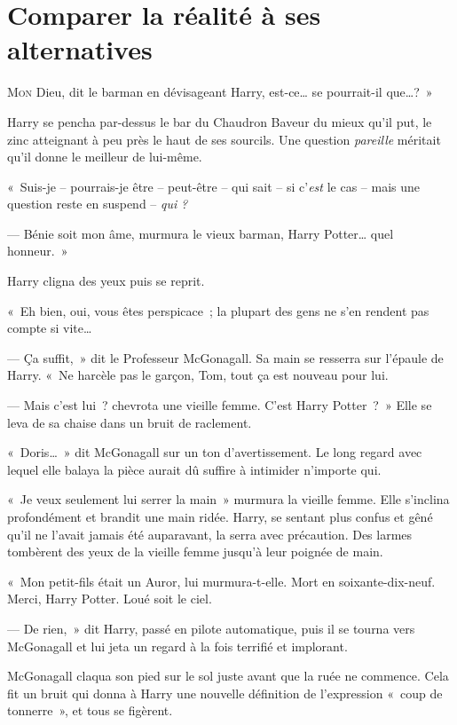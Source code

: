 \chapter{Comparer la réalité à ses alternatives}

\lettrine[ante=«~]{M}{on} Dieu, dit le barman en dévisageant Harry, est-ce… se pourrait-il que…?~»

Harry se pencha par-dessus le bar du Chaudron Baveur du mieux qu'il put, le zinc atteignant à peu près le haut de ses sourcils. Une question \emph{pareille} méritait qu'il donne le meilleur de lui-même.

«~Suis-je -- pourrais-je être -- peut-être -- qui sait -- si c'\emph{est} le cas -- mais une question reste en suspend -- \emph{qui} \emph{?}

--- Bénie soit mon âme, murmura le vieux barman, Harry Potter… quel honneur.~»

Harry cligna des yeux puis se reprit.

«~Eh bien, oui, vous êtes perspicace~; la plupart des gens ne s'en rendent pas compte si vite…

--- Ça suffit,~» dit le Professeur McGonagall. Sa main se resserra sur l'épaule de Harry. «~Ne harcèle pas le garçon, Tom, tout ça est nouveau pour lui.

--- Mais c'est lui~? chevrota une vieille femme. C'est Harry Potter~?~» Elle se leva de sa chaise dans un bruit de raclement.

«~Doris…~» dit McGonagall sur un ton d'avertissement. Le long regard avec lequel elle balaya la pièce aurait dû suffire à intimider n'importe qui.

«~Je veux seulement lui serrer la main~» murmura la vieille femme. Elle s'inclina profondément et brandit une main ridée. Harry, se sentant plus confus et gêné qu'il ne l'avait jamais été auparavant, la serra avec précaution. Des larmes tombèrent des yeux de la vieille femme jusqu'à leur poignée de main.

«~Mon petit-fils était un Auror, lui murmura-t-elle. Mort en soixante-dix-neuf. Merci, Harry Potter. Loué soit le ciel.

--- De rien,~» dit Harry, passé en pilote automatique, puis il se tourna vers McGonagall et lui jeta un regard à la fois terrifié et implorant.

McGonagall claqua son pied sur le sol juste avant que la ruée ne commence. Cela fit un bruit qui donna à Harry une nouvelle définition de l'expression «~coup de tonnerre~», et tous se figèrent.

